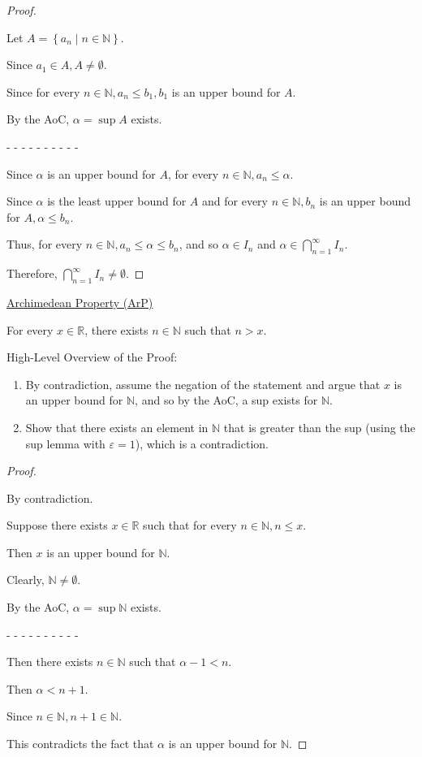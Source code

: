 \documentclass[12pt]{article}
\newcommand{\RR}{\mathbb{R}} %
\newcommand{\NN}{\mathbb{N}}
\newcommand\set[1]{\left\lbrace #1 \right\rbrace} %
\newcommand{\eps}{\varepsilon}
\begin{document}
\dotfill

\begin{proof}
$ $

Let $A = \set{a_n \mid n \in \NN}$.

Since $a_1 \in A, A \ne \emptyset$.

Since for every $n \in \NN, a_n \le b_1, b_1$ is an upper bound for $A$.

By the AoC, $\alpha = \sup A$ exists.

- - - - - - - - - -

Since $\alpha$ is an upper bound for $A$, for every $n \in \NN, a_n \le \alpha$.

Since $\alpha$ is the least upper bound for $A$ and for every $n \in \NN, b_n$ is an upper bound for $A, \alpha \le b_n$.

Thus, for every $n \in \NN, a_n \le \alpha \le b_n$, and so $\alpha \in I_n$ and $\alpha \in \bigcap_{n = 1}^{\infty} I_n$.

Therefore, $\bigcap_{n = 1}^{\infty} I_n \ne \emptyset$.
\end{proof}

\pagebreak

\underline{Archimedean Property (ArP)}

For every $x \in \RR$, there exists $n \in \NN$ such that $n > x$.

\dotfill

High-Level Overview of the Proof:

\begin{enumerate}
\item By contradiction, assume the negation of the statement and argue that $x$ is an upper bound for $\NN$, and so by the AoC, a sup exists for $\NN$.

\item Show that there exists an element in $\NN$ that is greater than the sup (using the sup lemma with $\eps = 1$), which is a contradiction.
\end{enumerate}

\dotfill

\begin{proof}
$ $

By contradiction.

Suppose there exists $x \in \RR$ such that for every $n \in \NN, n \le x$.

Then $x$ is an upper bound for $\NN$.

Clearly, $\NN \ne \emptyset$.

By the AoC, $\alpha = \sup \NN$ exists.

- - - - - - - - - -

Then there exists $n \in \NN$ such that $\alpha - 1 < n$.

Then $\alpha < n + 1$.

Since $n \in \NN, n + 1 \in \NN$.

This contradicts the fact that $\alpha$ is an upper bound for $\NN$.
\end{proof}
\end{document}

